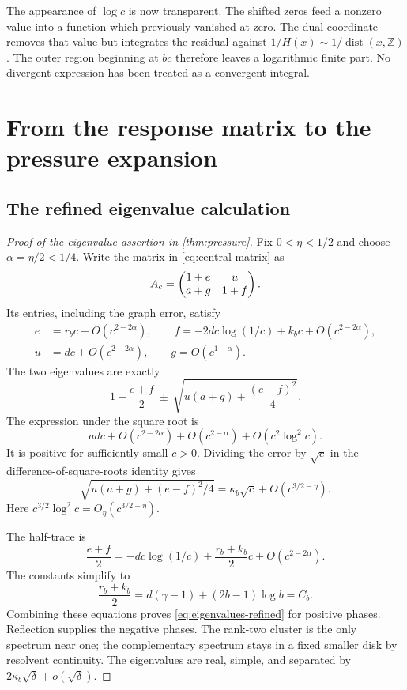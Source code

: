 \documentclass[11pt,a4paper]{article}
\numberwithin{equation}{section}
\theoremstyle{definition}
\theoremstyle{remark}
\newcommand{\ZZ}{\mathbb Z}
\newcommand{\dist}{\operatorname{dist}}
\begin{document}
The appearance of $\log c$ is now transparent. The shifted zeros feed
a nonzero value into a function which previously vanished at zero.
The dual coordinate removes that value but integrates the residual
against $1/H(x)\sim1/\dist(x,\ZZ)$. The outer region beginning at $bc$
therefore leaves a logarithmic finite part. No divergent expression has
been treated as a convergent integral.

\section{From the response matrix to the pressure expansion}
\label{sec:proof-pressure}

\subsection{The refined eigenvalue calculation}
\begin{proof}[Proof of the eigenvalue assertion in \cref{thm:pressure}]
Fix $0<\eta<1/2$ and choose $\alpha=\eta/2<1/4$. Write the matrix in
\cref{eq:central-matrix} as
\[
 A_c=\begin{pmatrix}1+e&u\cr a+g&1+f\end{pmatrix}.
\]
Its entries, including the graph error, satisfy
\begin{align}
 e&=r_bc+O(c^{2-2\alpha}),\qquad
 f=-2dc\log(1/c)+k_bc+O(c^{2-2\alpha}),\\
 u&=dc+O(c^{2-2\alpha}),\qquad
 g=O(c^{1-\alpha}).
 \label{eq:entry-errors}
\end{align}
The two eigenvalues are exactly
\begin{equation}
 1+\frac{e+f}{2}\ \pm\
 \sqrt{u(a+g)+\frac{(e-f)^2}{4}}.
 \label{eq:roots}
\end{equation}
The expression under the square root is
\begin{equation}
 ad c+O(c^{2-2\alpha})+O(c^{2-\alpha})
                 +O(c^2\log^2 c).
 \label{eq:discriminant}
\end{equation}
It is positive for sufficiently small $c>0$. Dividing the error by
$\sqrt c$ in the difference-of-square-roots identity gives
\begin{equation}
 \sqrt{u(a+g)+(e-f)^2/4}
   =\kappa_b\sqrt c+O(c^{3/2-\eta}).
 \label{eq:sqrt-error}
\end{equation}
Here $c^{3/2}\log^2c=O_\eta(c^{3/2-\eta})$.

The half-trace is
\begin{equation}
 \frac{e+f}{2}=-dc\log(1/c)+\frac{r_b+k_b}{2}c
                      +O(c^{2-2\alpha}).
\end{equation}
The constants simplify to
\begin{equation}
 \frac{r_b+k_b}{2}=d(\gamma-1)+(2b-1)\log b=C_b.
 \label{eq:Cconstant}
\end{equation}
Combining these equations proves \cref{eq:eigenvalues-refined} for
positive phases. Reflection supplies the negative phases. The rank-two
cluster is the only spectrum near one; the complementary spectrum stays
in a fixed smaller disk by resolvent continuity. The eigenvalues are
real, simple, and separated by $2\kappa_b\sqrt\delta+o(\sqrt\delta)$.
\end{proof}
\end{document}
